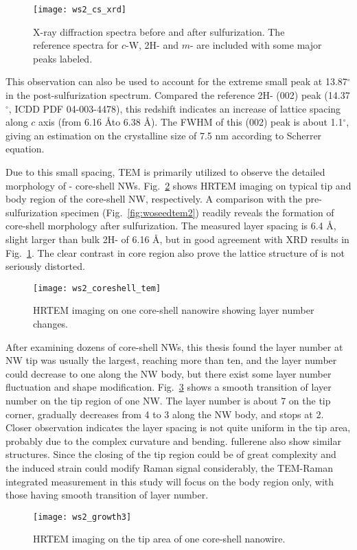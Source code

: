 \begin{figure}[htb]
\centering
\texttt{[image: ws2\_cs\_xrd]}
\caption[XRD on core-shell NWs]{X-ray diffraction spectra before and after sulfurization. The reference spectra for $c$-W, 2H- and $m$- are included with some major peaks labeled.}
\label{fig:ch5ws2xrd}
\end{figure}

This observation can also be used to account for the extreme small peak at 13.87$^{\circ}$ in the post-sulfurization spectrum. Compared the reference 2H- (002) peak (14.37$^{\circ}$, ICDD PDF 04-003-4478), this redshift indicates an increase of lattice spacing along $c$ axis (from 6.16 \AA to 6.38 \AA). The FWHM of this (002) peak is about 1.1$^{\circ}$, giving an estimation on the crystalline size of 7.5 nm according to Scherrer equation. 

Due to this small spacing, TEM is primarily utilized to observe the detailed morphology of - core-shell NWs. Fig.~\ref{fig:ch5ws2tem1} shows HRTEM imaging on typical tip and body region of the core-shell NW, respectively. A comparison with the pre-sulfurization specimen (Fig.~\ref{fig:woseedtem2}) readily reveals the formation of core-shell morphology after sulfurization. The measured layer spacing is 6.4 \AA, slight larger than bulk 2H- of 6.16 \AA, but in good agreement with XRD results in Fig.~\ref{fig:ch5ws2xrd}. The clear contrast in core region also prove the lattice structure of  is not seriously distorted.

\begin{figure}[htb]
\centering
\texttt{[image: ws2\_coreshell\_tem]}
\caption[TEM imaging on core-shell NWs: 1]{HRTEM imaging on one core-shell nanowire showing layer number changes.}
\label{fig:ch5ws2tem1}
\end{figure}

After examining dozens of core-shell NWs, this thesis found the  layer number at NW tip was usually the largest, reaching more than ten, and the layer number could decrease to one along the NW body, but there exist some layer number fluctuation and shape modification. Fig.~\ref{fig:ch5ws2tem3} shows a smooth transition of  layer number on the tip region of one NW. The layer number is about 7 on the tip corner, gradually decreases from 4 to 3 along the NW body, and stops at 2. Closer observation indicates the layer spacing is not quite uniform in the tip area, probably due to the complex curvature and bending.  fullerene also show similar structures. Since the closing of the tip region could be of great complexity and the induced strain could modify Raman signal considerably, the TEM-Raman integrated measurement in this study will focus on the body region only, with those having smooth transition of layer number.
\begin{figure}[htb]
\centering
\texttt{[image: ws2\_growth3]}
\caption[TEM imaging on core-shell NWs: 2]{HRTEM imaging on the tip area of one core-shell nanowire.}
\label{fig:ch5ws2tem3}
\end{figure}

